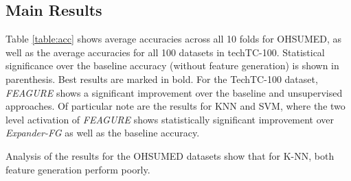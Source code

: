 \documentclass{article}
\theoremstyle{definition}
\begin{document}

	
	


\subsection{Main Results}

Table \ref{table:acc} shows average accuracies across all 10 folds for OHSUMED, as well as the average accuracies for all 100 datasets in techTC-100. Statistical significance over the baseline accuracy (without feature generation) is shown in parenthesis. Best results are marked in bold.
For the TechTC-100 dataset, \emph{FEAGURE} shows a significant improvement over the baseline and unsupervised approaches. %
Of particular note are the results for KNN and SVM, where the two level activation of \emph{FEAGURE} shows statistically significant improvement over \emph{Expander-FG} as well as the baseline accuracy. 

Analysis of the results for the OHSUMED datasets show that for K-NN, both feature generation perform poorly. %
\end{document}
